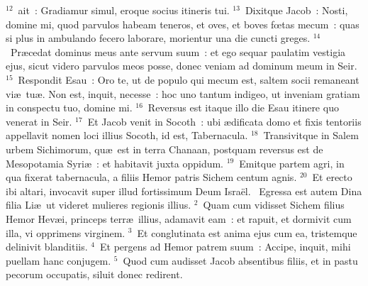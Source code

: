 ${}^{12}$~ait~: Gradiamur simul, eroque socius itineris tui.
${}^{13}$~Dixitque Jacob~: Nosti, domine mi, quod parvulos habeam teneros, et oves, et boves fœtas mecum~: quas si plus in ambulando fecero laborare, morientur una die cuncti greges.
${}^{14}$~Pr\ae cedat dominus meus ante servum suum~: et ego sequar paulatim vestigia ejus, sicut videro parvulos meos posse, donec veniam ad dominum meum in Seir.
${}^{15}$~Respondit Esau~: Oro te, ut de populo qui mecum est, saltem socii remaneant vi\ae\ tu\ae . Non est, inquit, necesse~: hoc uno tantum indigeo, ut inveniam gratiam in conspectu tuo, domine mi.
${}^{16}$~Reversus est itaque illo die Esau itinere quo venerat in Seir.
${}^{17}$~Et Jacob venit in Socoth~: ubi \ae dificata domo et fixis tentoriis appellavit nomen loci illius Socoth, id est, Tabernacula.
${}^{18}$~Transivitque in Salem urbem Sichimorum, qu\ae\ est in terra Chanaan, postquam reversus est de Mesopotamia Syri\ae~: et habitavit juxta oppidum.
${}^{19}$~Emitque partem agri, in qua fixerat tabernacula, a filiis Hemor patris Sichem centum agnis.
${}^{20}$~Et erecto ibi altari, invocavit super illud fortissimum Deum Isra\"el.
~Egressa est autem Dina filia Li\ae\ ut videret mulieres regionis illius.
${}^{2}$~Quam cum vidisset Sichem filius Hemor Hev\ae i, princeps terr\ae\ illius, adamavit eam~: et rapuit, et dormivit cum illa, vi opprimens virginem.
${}^{3}$~Et conglutinata est anima ejus cum ea, tristemque delinivit blanditiis.
${}^{4}$~Et pergens ad Hemor patrem suum~: Accipe, inquit, mihi puellam hanc conjugem.
${}^{5}$~Quod cum audisset Jacob absentibus filiis, et in pastu pecorum occupatis, siluit donec redirent.


